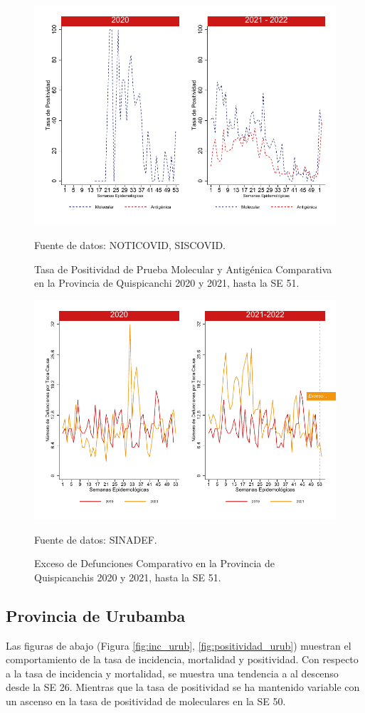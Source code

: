 \documentclass[12pt,a4paper,openany]{book}
\begin{document}
		\begin{figure}[h]
			\caption{Tasa de Positividad de Prueba Molecular y Antigénica Comparativa en la Provincia de Quispicanchi 2020 y 2021, hasta la SE 51.}\label{fig:positividad_quisp}
			\begin{center}
				\includegraphics[width=0.7\linewidth]{../figuras/positividad_20_21_12}
			\end{center}
			{\footnotesize {Fuente de datos: NOTICOVID, SISCOVID.}}
		\end{figure}
		
		\begin{figure}[h]
			\caption{Exceso de Defunciones Comparativo en la Provincia de Quispicanchis 2020 y 2021, hasta la SE 51.}\label{fig:exceso_quisp}
			\begin{center}
				\includegraphics[width=0.7\linewidth]{../figuras/exceso_12}
			\end{center}
			{\footnotesize {Fuente de datos: SINADEF.}}
		\end{figure}
		
		\clearpage
		
		\subsection*{Provincia de Urubamba}
		\noindent Las figuras de abajo (Figura \ref{fig:inc_urub}, \ref{fig:positividad_urub}) muestran el comportamiento de la tasa de incidencia, mortalidad y positividad. Con respecto a la tasa de incidencia y mortalidad, se muestra una tendencia a al descenso desde la SE 26. Mientras que la tasa de positividad se ha mantenido variable con un ascenso en la tasa de positividad de moleculares en la SE 50.
	
\end{document}
